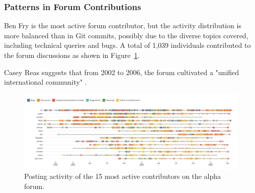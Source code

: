 \documentclass{article}
\begin{document}




\subsubsection{Patterns in Forum Contributions}

Ben Fry is the most active forum contributor, but the activity distribution is more balanced than in Git commits, possibly due to the diverse topics covered, including technical queries and bugs. A total of 1,039 individuals contributed to the forum discussions as shown in Figure~\ref{fig:processing-alpha-dot}.

Casey Reas suggests that from 2002 to 2006, the forum cultivated a "unified international community" \parencite[331]{conradGraphicDesignPostdigital2021}. 

\begin{figure}[h!]
  \centering
  \includegraphics[width=1.0\textwidth]{images/alpha-forum-top15.png}
  \caption{Posting activity of the 15 most active contributors on the alpha forum.}
  \label{fig:processing-alpha-dot}
\end{figure}
\end{document}
